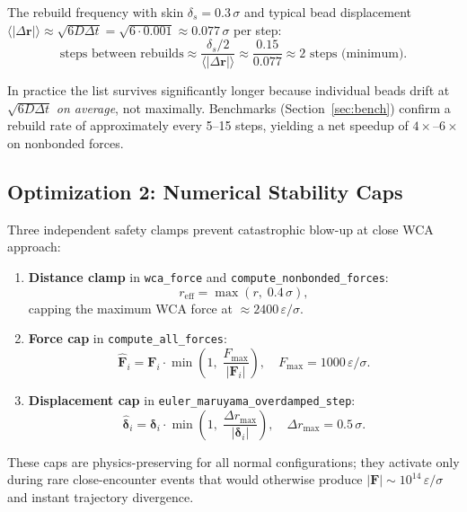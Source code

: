 \documentclass[12pt,a4paper]{article}
\newcommand{\code}[1]{\texttt{#1}}
\begin{document}
The rebuild frequency with skin $\delta_s = 0.3\,\sigma$ and typical bead
displacement $\langle|\Delta\mathbf{r}|\rangle \approx \sqrt{6D\Delta t}
= \sqrt{6\cdot0.001}\approx 0.077\,\sigma$ per step:
\[
  \text{steps between rebuilds} \approx
  \frac{\delta_s/2}{\langle|\Delta\mathbf{r}|\rangle}
  \approx \frac{0.15}{0.077} \approx 2 \text{ steps (minimum)}.
\]

In practice the list survives significantly longer because individual beads
drift at $\sqrt{6D\Delta t}$ \emph{on average}, not maximally. Benchmarks
(Section~\ref{sec:bench}) confirm a rebuild rate of approximately every 5--15
steps, yielding a net speedup of $4\times$--$6\times$ on nonbonded forces.

\subsection{Optimization 2: Numerical Stability Caps}
\label{sec:caps}

Three independent safety clamps prevent catastrophic blow-up at close WCA approach:

\begin{enumerate}[label=\arabic*)]
\item \textbf{Distance clamp} in \code{wca\_force} and \code{compute\_nonbonded\_forces}:
  \begin{equation}
    r_\text{eff} = \max(r,\; 0.4\,\sigma),
  \end{equation}
  capping the maximum WCA force at $\approx 2400\,\varepsilon/\sigma$.

\item \textbf{Force cap} in \code{compute\_all\_forces}:
  \begin{equation}
    \hat{\mathbf{F}}_i = \mathbf{F}_i \cdot
    \min\!\!\left(1,\; \frac{F_\text{max}}{|\mathbf{F}_i|}\right),
    \quad F_\text{max} = 1000\,\varepsilon/\sigma.
  \end{equation}

\item \textbf{Displacement cap} in \code{euler\_maruyama\_overdamped\_step}:
  \begin{equation}
    \hat{\boldsymbol{\delta}}_i = \boldsymbol{\delta}_i \cdot
    \min\!\!\left(1,\; \frac{\Delta r_\text{max}}{|\boldsymbol{\delta}_i|}\right),
    \quad \Delta r_\text{max} = 0.5\,\sigma.
  \end{equation}
\end{enumerate}

These caps are physics-preserving for all normal configurations; they activate
only during rare close-encounter events that would otherwise produce
$|\mathbf{F}| \sim 10^{14}\,\varepsilon/\sigma$ and instant trajectory divergence.
\end{document}
